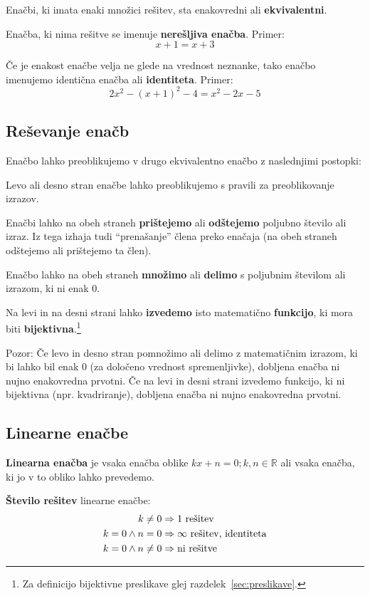 \documentclass[a4paper,oneside,12pt,fleqn]{article}
\def\R{\ensuremath{\mathbb R}}
\renewcommand\implies\Rightarrow
\numberwithin{equation}{section}
\newenvironment{itemize*}%
{
\vspace{-12pt}%
\begin{itemize}%
\setlength{\itemsep}{0pt}%
\setlength{\parskip}{2pt}}%
{\end{itemize}}
\begin{document}
Enačbi, ki imata enaki množici rešitev, sta enakovredni ali \textbf{ekvivalentni}.

Enačba, ki nima rešitve se imenuje \textbf{nerešljiva enačba}. Primer:
\[ x + 1 = x + 3 \]

Če je enakost enačbe velja ne glede na vrednost neznanke, tako enačbo imenujemo identična
enačba ali \textbf{identiteta}. Primer:
\[2x^2 -(x + 1)^2 - 4 = x^2 - 2x - 5 \]

\subsection{Reševanje enačb}
\label{sec:enac:resev}
Enačbo lahko preoblikujemo v drugo ekvivalentno enačbo z naslednjimi postopki:
\begin{itemize*}
  \item Levo ali desno stran enačbe lahko preoblikujemo s pravili za preoblikovanje
    izrazov.
  \item Enačbi lahko na obeh straneh \textbf{prištejemo} ali \textbf{odštejemo} poljubno število
ali izraz. Iz tega izhaja tudi ``prenašanje'' člena preko enačaja (na obeh straneh odštejemo ali
prištejemo ta člen).

  \item Enačbo lahko na obeh straneh \textbf{množimo} ali \textbf{delimo} s poljubnim številom ali izrazom, ki ni
enak 0. 

  \item Na levi in na desni strani lahko \textbf{izvedemo} isto matematično \textbf{funkcijo}, ki mora biti
\textbf{bijektivna}.\footnote{Za definicijo bijektivne preslikave glej
razdelek~\ref{sec:preslikave}.}
\end{itemize*}

Pozor: Če levo in desno stran pomnožimo ali delimo z matematičnim izrazom, ki bi lahko bil
enak 0 (za določeno vrednost spremenljivke), dobljena enačba ni nujno enakovredna prvotni.
Če na levi in desni strani izvedemo funkcijo, ki ni bijektivna (npr. kvadriranje),
dobljena enačba ni nujno enakovredna prvotni.

\subsection{Linearne enačbe}
\label{sec:enac:lin}
\textbf{Linearna enačba} je vsaka enačba oblike $kx + n = 0; k, n \in \R$ ali vsaka enačba, ki jo v to
obliko lahko prevedemo.

\textbf{Število rešitev} linearne enačbe:
\begin{align*}
  k \neq 0 &\implies \textnormal{1 rešitev} \\
  k = 0 \land n = 0 &\implies \infty \textnormal{ rešitev, identiteta} \\
  k = 0 \land n \neq 0 &\implies \textnormal{ni rešitve}
\end{align*}
\end{document}
